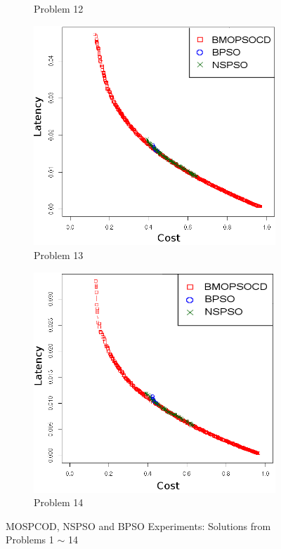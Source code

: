 \begin{figure}[]
\begin{subfigure}{0.30\textwidth}
	   \caption{Problem 12}
   \end{subfigure}
      \begin{subfigure}{0.30\textwidth}
       \includegraphics[width=\textwidth]{pics/total13.png}
	   \caption{Problem 13}
   \end{subfigure}
      \begin{subfigure}{0.30\textwidth}
       \includegraphics[width=\textwidth]{pics/total14.png}
	   \caption{Problem 14}
   \end{subfigure}
   \caption{MOSPCOD, NSPSO and BPSO Experiments: Solutions from Problems 1 $\sim$ 14}
   \label{fig:total}
\end{figure}

